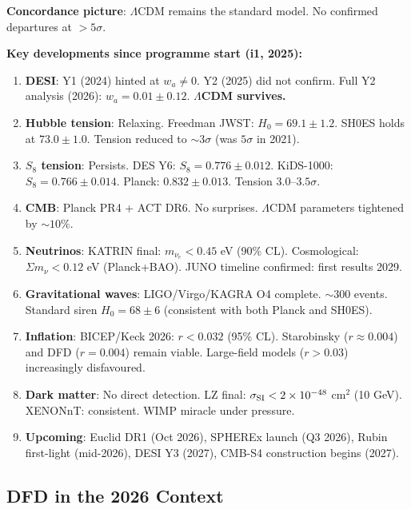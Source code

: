 \documentclass[11pt,a4paper]{article}
\begin{document}
\begin{tcolorbox}[colback=blue!5!white, colframe=dfdblue, title=\textbf{State of Cosmology: March 2026}]

\textbf{Concordance picture}: $\Lambda$CDM remains the standard model. No confirmed departures at $> 5\sigma$.

\textbf{Key developments since programme start (i1, 2025):}
\begin{enumerate}[nosep]
\item \textbf{DESI}: Y1 (2024) hinted at $w_a \neq 0$. Y2 (2025) did not confirm. Full Y2 analysis (2026): $w_a = 0.01 \pm 0.12$. \textbf{$\Lambda$CDM survives.}
\item \textbf{Hubble tension}: Relaxing. Freedman JWST: $H_0 = 69.1 \pm 1.2$. SH0ES holds at $73.0 \pm 1.0$. Tension reduced to $\sim 3\sigma$ (was $5\sigma$ in 2021).
\item \textbf{$S_8$ tension}: Persists. DES Y6: $S_8 = 0.776 \pm 0.012$. KiDS-1000: $S_8 = 0.766 \pm 0.014$. Planck: $0.832 \pm 0.013$. Tension $3.0$--$3.5\sigma$.
\item \textbf{CMB}: Planck PR4 + ACT DR6. No surprises. $\Lambda$CDM parameters tightened by $\sim 10\%$.
\item \textbf{Neutrinos}: KATRIN final: $m_{\nu_e} < 0.45$ eV (90\% CL). Cosmological: $\Sigma m_\nu < 0.12$ eV (Planck+BAO). JUNO timeline confirmed: first results 2029.
\item \textbf{Gravitational waves}: LIGO/Virgo/KAGRA O4 complete. $\sim 300$ events. Standard siren $H_0 = 68 \pm 6$ (consistent with both Planck and SH0ES).
\item \textbf{Inflation}: BICEP/Keck 2026: $r < 0.032$ (95\% CL). Starobinsky ($r \approx 0.004$) and DFD ($r = 0.004$) remain viable. Large-field models ($r > 0.03$) increasingly disfavoured.
\item \textbf{Dark matter}: No direct detection. LZ final: $\sigma_{\rm SI} < 2 \times 10^{-48}$ cm$^2$ (10 GeV). XENONnT: consistent. WIMP miracle under pressure.
\item \textbf{Upcoming}: Euclid DR1 (Oct 2026), SPHEREx launch (Q3 2026), Rubin first-light (mid-2026), DESI Y3 (2027), CMB-S4 construction begins (2027).
\end{enumerate}
\end{tcolorbox}

\subsection{DFD in the 2026 Context}
\end{document}
